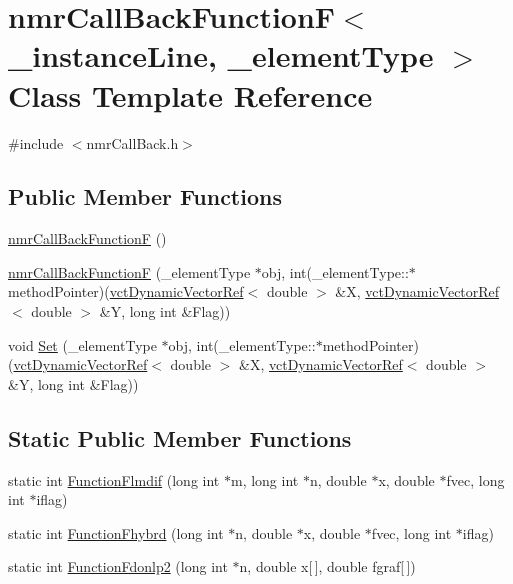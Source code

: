 \hypertarget{classnmr_call_back_function_f}{\section{nmr\-Call\-Back\-Function\-F$<$ \-\_\-instance\-Line, \-\_\-element\-Type $>$ Class Template Reference}
\label{classnmr_call_back_function_f}
}


{\ttfamily \#include $<$nmr\-Call\-Back.\-h$>$}

\subsection*{Public Member Functions}
\begin{DoxyCompactItemize}
\item 
\hyperlink{classnmr_call_back_function_f_a503a8c5e30192b9ba98e5d354043d5f3}{nmr\-Call\-Back\-Function\-F} ()
\item 
\hyperlink{classnmr_call_back_function_f_ac80a751c5c2863acab71971ca058d35c}{nmr\-Call\-Back\-Function\-F} (\-\_\-element\-Type $\ast$obj, int(\-\_\-element\-Type\-::$\ast$method\-Pointer)(\hyperlink{classvct_dynamic_vector_ref}{vct\-Dynamic\-Vector\-Ref}$<$ double $>$ \&X, \hyperlink{classvct_dynamic_vector_ref}{vct\-Dynamic\-Vector\-Ref}$<$ double $>$ \&Y, long int \&Flag))
\item 
void \hyperlink{classnmr_call_back_function_f_ac80177c8b4d6276bfbcd8f554c09bc73}{Set} (\-\_\-element\-Type $\ast$obj, int(\-\_\-element\-Type\-::$\ast$method\-Pointer)(\hyperlink{classvct_dynamic_vector_ref}{vct\-Dynamic\-Vector\-Ref}$<$ double $>$ \&X, \hyperlink{classvct_dynamic_vector_ref}{vct\-Dynamic\-Vector\-Ref}$<$ double $>$ \&Y, long int \&Flag))
\end{DoxyCompactItemize}
\subsection*{Static Public Member Functions}
\begin{DoxyCompactItemize}
\item 
static int \hyperlink{classnmr_call_back_function_f_a3d3c1e5cf266c8257be54c81a6bfc2be}{Function\-Flmdif} (long int $\ast$m, long int $\ast$n, double $\ast$x, double $\ast$fvec, long int $\ast$iflag)
\item 
static int \hyperlink{classnmr_call_back_function_f_ab248cbd9d02d4969bb8e9e3c6d0d8e6c}{Function\-Fhybrd} (long int $\ast$n, double $\ast$x, double $\ast$fvec, long int $\ast$iflag)
\item 
static int \hyperlink{classnmr_call_back_function_f_ac0dda9815ccf046edc764ad6e66e3435}{Function\-Fdonlp2} (long int $\ast$n, double x\mbox{[}$\,$\mbox{]}, double fgraf\mbox{[}$\,$\mbox{]})
\end{DoxyCompactItemize}
